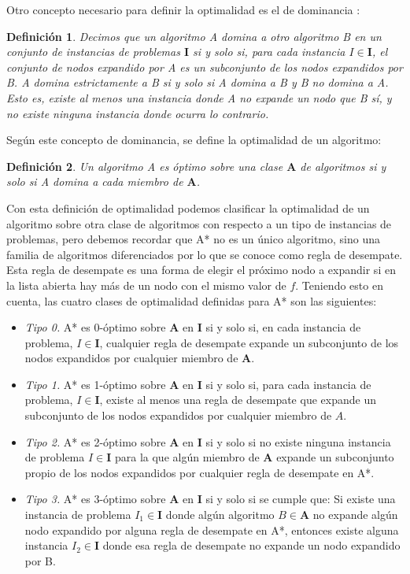\documentclass[a4paper,12pt]{article}
\newtheorem{defn}{Definición}
\begin{document}
Otro concepto necesario para definir la optimalidad es el de dominancia \cite{nilsson2014principles}:

\begin{defn}
Decimos que un algoritmo A domina a otro algoritmo B en un conjunto de instancias de problemas $\textbf{I}$ si y solo si, para cada instancia $I\in\textbf{I}$, el conjunto de nodos expandido por A es un subconjunto de los nodos expandidos por B. A domina estrictamente a B si y solo si A domina a B y B no domina a A. Esto es, existe al menos una instancia  donde A no expande un nodo que B sí, y no existe ninguna instancia donde ocurra lo contrario.
\end{defn}

\noindent Según este concepto de dominancia, se define la optimalidad de un algoritmo:

\begin{defn}
Un algoritmo A es óptimo sobre una clase $\textbf{A}$ de algoritmos si y solo si A domina a cada miembro de $\textbf{A}$.
\end{defn}

Con esta definición de optimalidad podemos clasificar la optimalidad de un algoritmo sobre otra clase de algoritmos con respecto a un tipo de instancias de problemas, pero debemos recordar que A* no es un único algoritmo, sino una familia de algoritmos diferenciados por lo que se conoce como regla de desempate. Esta regla de desempate es una forma de elegir el próximo nodo a expandir si en la lista abierta hay más de un nodo con el mismo valor de $f$. Teniendo esto en cuenta, las cuatro clases de optimalidad definidas para A* son las siguientes:

\begin{itemize}
    \item \textit{Tipo 0.} A* es 0-óptimo sobre \textbf{A} en \textbf{I} si y solo si, en cada instancia de problema, $I \in \textbf{I}$, cualquier regla de desempate expande un subconjunto de los nodos expandidos por cualquier miembro de \textbf{A}.
    \item \textit{Tipo 1.} A* es 1-óptimo sobre \textbf{A} en \textbf{I} si y solo si, para cada instancia de problema, $I\in\textbf{I}$, existe al menos una regla de desempate que expande un subconjunto de los nodos expandidos por cualquier miembro de $A$.
    \item \textit{Tipo 2.} A* es 2-óptimo sobre \textbf{A} en \textbf{I} si y solo si no existe ninguna instancia de problema $I\in\textbf{I}$ para la que algún miembro de \textbf{A} expande un subconjunto propio de los nodos expandidos por cualquier regla de desempate en A*.
    \item \textit{Tipo 3.} A* es 3-óptimo sobre \textbf{A} en \textbf{I} si y solo si se cumple que:
    Si existe una instancia de problema $I_1\in\textbf{I}$ donde algún algoritmo $B\in\textbf{A}$ no expande algún nodo expandido por alguna regla de desempate en A*, entonces existe alguna instancia $I_2\in\textbf{I}$ donde esa regla de desempate no expande un nodo expandido por B.
\end{itemize}
\end{document}
